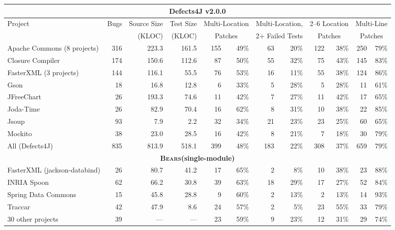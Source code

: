 \documentclass[10pt, conference]{IEEEtran}
\newcommand\bears{\textsc{Bears}\xspace}
\begin{document}
\begin{table}
\begin{center}
\begin{tabular}{l  rrr | rr rr rr rr }
\toprule
\multicolumn{12}{c}{\textbf{Defects4J v2.0.0}} \\
\midrule
\multirow{2}{*}{Project} & \multirow{2}{*}{Bugs} & Source Size & Test Size & \multicolumn{2}{c}{Multi-Location} & \multicolumn{2}{c}{Multi-Location,}      & \multicolumn{2}{c}{2--6 Location} & \multicolumn{2}{c}{Multi-Line} \\
            &          &  (KLOC) & (KLOC)&
\multicolumn{2}{c}{Patches}              & \multicolumn{2}{c}{2+ Failed Tests}   & \multicolumn{2}{c}{Patches}             & \multicolumn{2}{c}{Patches} \\
\midrule
Apache Commons (8 projects) & 316 & 223.3 & 161.5 & 155 & 49\% & 63 & 20\% & 122 & 38\%
& 250 & 79\%\\
Closure Compiler & 174 & 150.6 & 112.6 & 87 & 50\% & 55 & 32\% & 75 & 43\% & 145
& 83\% \\
FasterXML (3 projects) & 144 & 116.1 & 55.5 & 76 & 53\% & 16 & 11\% & 55 & 38\% & 124 & 86\%\\
Gson & 18 & 16.8 & 12.8 & 6 & 33\% & 5 & 28\% & 5 & 28\% & 11 & 61\% \\
JFreeChart  & 26 & 193.3 & 74.6  & 11 & 42\% & 7 & 27\% & 11 & 42\% & 17 & 65\%\\
Joda-Time & 26 & 82.9 & 70.4 & 16 & 62\% & 8 & 31\% & 10 & 38\% & 22 & 85\% \\
Jsoup & 93 & 7.9 & 2.2 & 32 & 34\% & 21 & 23\% & 23 & 25\% & 60 & 65\% \\
Mockito & 38 & 23.0 & 28.5 & 16 & 42\% & 8 & 21\% & 7 & 18\% & 30 & 79\% \\
\midrule
All (Defects4J) & 835 & 813.9 & 518.1 & 399 & 48\% & 183 & 22\% & 308 & 37\% & 659 & 79\%\\
\midrule
\multicolumn{12}{c}{\textbf{\bears (single-module)}} \\
\midrule
FasterXML (jackson-databind) & 26 & 80.7 & 41.2 & 17 & 65\% & 2 & 8\% & 10 & 38\% & 23 & 88\% \\
INRIA Spoon & 62 & 66.2 & 30.8  & 39 & 63\% & 18 & 29\% & 17 & 27\% & 52 & 84\% \\
Spring Data Commons & 15 & 45.8 & 28.8  & 9 & 60\% & 2 & 13\% & 2 & 13\% & 14 & 93\% \\
Traccar & 42 & 47.9 & 8.6 & 24 & 57\% & 2 & 5\% & 23 & 55\% & 33 & 79\% \\
30 other projects & 39 & --- & --- & 23 & 59\% & 9 & 23\% & 12 & 31\% & 29 & 74\% \\

\end{tabular}
\end{center}
\end{table}
\end{document}
